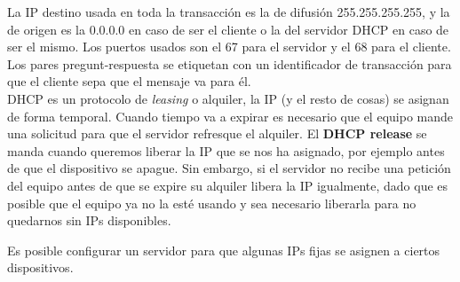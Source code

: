 
La IP destino usada en toda la transacción es la de difusión 255.255.255.255, y la de origen es la 0.0.0.0 en caso de ser el cliente o la del servidor DHCP en caso de ser el mismo. Los puertos usados son el 67 para el servidor y el 68 para el cliente.\\

Los pares pregunt-respuesta se etiquetan con un identificador de transacción para que el cliente sepa que el mensaje va para él.\\

\acrshort{DHCP} es un protocolo de \textit{leasing} o alquiler, la IP (y el resto de cosas) se asignan de forma temporal. Cuando tiempo va a expirar es necesario que el equipo mande una solicitud para que el servidor refresque el alquiler. El \textbf{DHCP release} se manda cuando queremos liberar la IP que se nos ha asignado, por ejemplo antes de que el dispositivo se apague. Sin embargo, si el servidor no recibe una petición del equipo antes de que se expire su alquiler libera la IP igualmente, dado que es posible que el equipo ya no la esté usando y sea necesario liberarla para no quedarnos sin IPs disponibles. 

\begin{observacion}
    Es posible configurar un servidor para que algunas IPs fijas se asignen a ciertos dispositivos.
\end{observacion}


